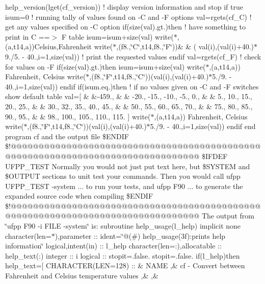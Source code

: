 \begin{DoxyCompactItemize}
help\+\_\+version(lget(\textquotesingle{}cf\+\_\+version\textquotesingle{})) ! display version information and stop if true isum=0 ! running tally of values found on -\/\+C and -\/\+F options val=rgets(\textquotesingle{}cf\+\_\+\+C\textquotesingle{}) ! get any values specified on -\/\+C option if(size(val).\+gt.)then ! have something to print in C ==$>$ F table isum=isum+size(val) write($\ast$,\textquotesingle{}(a,t14,a)\textquotesingle{})\textquotesingle{}\+Celsius\textquotesingle{},\textquotesingle{}\+Fahrenheit\textquotesingle{} write($\ast$,\textquotesingle{}(f8.,\char`\"{}\+C\char`\"{},t14,f8.,\char`\"{}\+F\char`\"{})\textquotesingle{})\& \& ( val(i),(val(i)+40.)$\ast$9./5. -\/ 40.,i=1,size(val)) ! print the requested values endif val=rgets(\textquotesingle{}cf\+\_\+\+F\textquotesingle{}) ! check for values on -\/\+F if(size(val).\+gt.)then isum=isum+size(val) write($\ast$,\textquotesingle{}(a,t14,a)\textquotesingle{}) \textquotesingle{}\+Fahrenheit\textquotesingle{}, \textquotesingle{}\+Celsius\textquotesingle{} write($\ast$,\textquotesingle{}(f8.,\char`\"{}\+F\char`\"{},t14,f8.,\char`\"{}\+C\char`\"{})\textquotesingle{})(val(i),(val(i)+40.)$\ast$5./9. -\/ 40.,i=1,size(val)) endif if(isum.\+eq.)then ! if no values given on -\/\+C and -\/\+F switches show default table val=\mbox{[} \& \&-\/459., \& \& -\/20., -\/15., -\/10., -\/5., 0., \& \& 5., 10., 15., 20., 25., \& \& 30., 32., 35., 40., 45., \& \& 50., 55., 60., 65., 70., \& \& 75., 80., 85., 90., 95., \& \& 98., 100., 105., 110., 115. \mbox{]} write($\ast$,\textquotesingle{}(a,t14,a)\textquotesingle{}) \textquotesingle{}\+Fahrenheit\textquotesingle{}, \textquotesingle{}\+Celsius\textquotesingle{} write($\ast$,\textquotesingle{}(f8.,\char`\"{}\+F\char`\"{},t14,f8.,\char`\"{}\+C\char`\"{})\textquotesingle{})(val(i),(val(i)+40.)$\ast$5./9. -\/ 40.,i=1,size(val)) endif end program cf and the output file \$\+E\+N\+D\+I\+F \$!@@@@@@@@@@@@@@@@@@@@@@@@@@@@@@@@@@@@@@@@@@@@@@@@@@@@@@@@@@@@@@@@@@@@@@@@@@@@@@@@ \$\+I\+F\+D\+E\+F U\+F\+P\+P\+\_\+\+T\+E\+S\+T Normally you would not just put text here, but \$\+S\+Y\+S\+T\+E\+M and \$\+O\+U\+T\+P\+U\+T sections to unit test your commands. Then you would call ufpp U\+F\+P\+P\+\_\+\+T\+E\+S\+T -\/system ... to run your tests, and ufpp F90 ... to generate the expanded source code when compiling \$\+E\+N\+D\+I\+F \$!@@@@@@@@@@@@@@@@@@@@@@@@@@@@@@@@@@@@@@@@@@@@@@@@@@@@@@@@@@@@@@@@@@@@@@@@@@@@@@@@ The output from \char`\"{}ufpp F90 -\/i F\+I\+L\+E -\/system\char`\"{} is\+: subroutine help\+\_\+usage(l\+\_\+help) implicit none character(len=$\ast$),parameter \+:: ident=\char`\"{}@(\#) help\+\_\+usage(3f)\+:prints help information\char`\"{} logical,intent(in) \+:: l\+\_\+help character(len=\+:),allocatable \+:: help\+\_\+text(\+:) integer \+:: i logical \+:: stopit=.\+false. stopit=.\+false. if(l\+\_\+help)then help\+\_\+text=\mbox{[} C\+H\+A\+R\+A\+C\+T\+E\+R(\+L\+E\+N=128) \+:: \& \textquotesingle{}\+N\+A\+M\+E \textquotesingle{},\& \textquotesingle{} cf -\/ Convert between Fahrenheit and Celsius temperature values \textquotesingle{},\& \textquotesingle{} \textquotesingle{},\& 
\end{DoxyCompactItemize}
